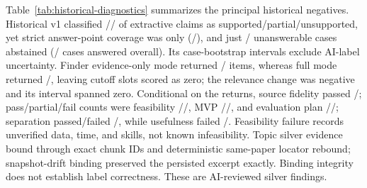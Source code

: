 \documentclass[conference,letterpaper]{IEEEtran}
\begin{document}
Table~\ref{tab:historical-diagnostics} summarizes the principal historical negatives. Historical v1 classified \PaperQaSupportedClaimCount{}/\PaperQaPartialClaimCount{}/\PaperQaUnsupportedClaimCount{} of \PaperQaClaimCount{} extractive claims as supported/partial/unsupported, yet strict answer-point coverage was only \PaperQaAnswerCoverage{} (\PaperQaCoveredAnswerPointCount/\PaperQaAnswerPointCount), and just \PaperQaAbstentionCount/\PaperQaUnanswerableCount{} unanswerable cases abstained (\PaperQaAnsweredCount/\PaperQaCaseCount{} cases answered overall). Its case-bootstrap intervals exclude AI-label uncertainty. Finder evidence-only mode returned \PaperRecommendationEvidenceReturnedCount/\PaperRecommendationRequestedSlotCount{} items, whereas full mode returned \PaperRecommendationFullReturnedCount/\PaperRecommendationRequestedSlotCount{}, leaving \PaperRecommendationFullMissingCount{} cutoff slots scored as zero; the relevance change was negative and its interval spanned zero. Conditional on the \PaperRecommendationFullReturnedCount{} returns, source fidelity passed \PaperRecommendationFullReturnedCount/\PaperRecommendationFullReturnedCount; pass/partial/fail counts were feasibility \PaperRecommendationFeasibilityPass/\PaperRecommendationFeasibilityPartial/\PaperRecommendationFeasibilityFail, MVP \PaperRecommendationMvpPass/\PaperRecommendationMvpPartial/\PaperRecommendationMvpFail, and evaluation plan \PaperRecommendationPlanPass/\PaperRecommendationPlanPartial/\PaperRecommendationPlanFail; separation passed/failed \PaperRecommendationSeparationPass/\PaperRecommendationSeparationFail, while usefulness failed \PaperRecommendationUsefulnessFail/\PaperRecommendationFullReturnedCount. Feasibility failure records unverified data, time, and skills, not known infeasibility. Topic silver evidence bound through \PaperTopicBindingExactCount{} exact chunk IDs and \PaperTopicBindingReboundCount{} deterministic same-paper locator rebound; \PaperTopicBindingDriftCount{} snapshot-drift binding preserved the persisted excerpt exactly. Binding integrity does not establish label correctness. These are AI-reviewed silver findings.
\end{document}
